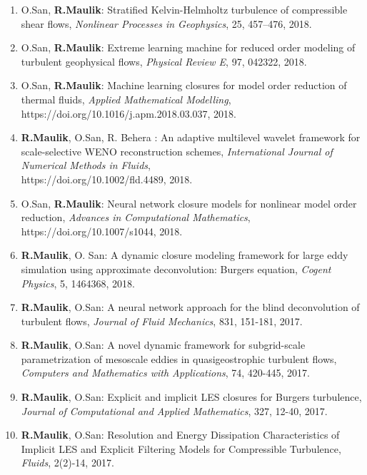 \documentclass[letterpaper]{article}
\begin{document}
\begin{enumerate}
\item O.San, \textbf{R.Maulik}: Stratified Kelvin-Helmholtz turbulence of compressible shear flows, {\it Nonlinear Processes in Geophysics}, 25, 457--476, 2018.
 
\item O.San, \textbf{R.Maulik}: Extreme learning machine for reduced order modeling of turbulent geophysical flows, {\it Physical Review E}, 97, 042322, 2018.

\item O.San, \textbf{R.Maulik}: Machine learning closures for model order reduction of thermal fluids,  {\it Applied Mathematical Modelling}, https://doi.org/10.1016/j.apm.2018.03.037, 2018.

\item \textbf{R.Maulik}, O.San, R. Behera : An adaptive multilevel wavelet framework for scale-selective WENO reconstruction schemes, {\it International Journal of Numerical Methods in Fluids},\\ https://doi.org/10.1002/fld.4489, 2018.

\item O.San, \textbf{R.Maulik}: Neural network closure models for nonlinear model order reduction, {\it Advances in Computational Mathematics}, https://doi.org/10.1007/s1044, 2018.

\item \textbf{R.Maulik}, O. San: A dynamic closure modeling framework for large eddy simulation using approximate deconvolution: Burgers equation, {\it Cogent Physics}, 5, 1464368, 2018.

\item \textbf{R.Maulik}, O.San: A neural network approach for the blind deconvolution of turbulent flows, {\it Journal of Fluid Mechanics}, 831, 151-181, 2017.

\item \textbf{R.Maulik}, O.San: A novel dynamic framework for subgrid-scale parametrization of mesoscale eddies in quasigeostrophic turbulent flows, {\it Computers and Mathematics with Applications}, 74, 420-445, 2017.

\item \textbf{R.Maulik}, O.San: Explicit and implicit LES closures for Burgers turbulence, {\it Journal of Computational and Applied Mathematics}, 327, 12-40, 2017.

\item \textbf{R.Maulik}, O.San: Resolution and Energy Dissipation Characteristics of Implicit LES and Explicit Filtering Models for Compressible Turbulence, {\it Fluids}, 2(2)-14, 2017.


\end{enumerate}
\end{document}
